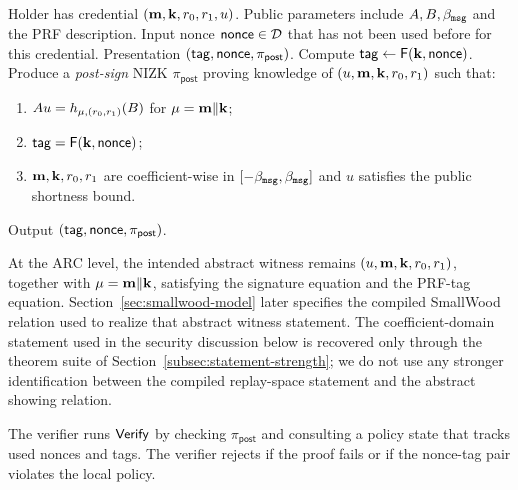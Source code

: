 \begin{algorithm}[H]
\caption{\(\Show\): ARC presentation (canonical protocol)}
\label{alg:showing}
\begin{algorithmic}[1]
\Require Holder has credential \((\mathbf{m},\mathbf{k},r_0,r_1,u)\). Public parameters include \(A,B,\beta_{\mathtt{msg}}\) and the PRF description.
\Require Input nonce \(\mathsf{nonce}\in\mathcal{D}\) that has not been used before for this credential.
\Ensure Presentation \((\mathsf{tag},\mathsf{nonce},\pi_{\mathsf{post}})\).
\State Compute \(\mathsf{tag}\gets \mathsf{F}(\mathbf{k},\mathsf{nonce})\).
\State Produce a \emph{post-sign} NIZK \(\pi_{\mathsf{post}}\) proving knowledge of \((u,\mathbf{m},\mathbf{k},r_0,r_1)\) such that:
\begin{enumerate}[leftmargin=1.6em]
  \item \(A u = h_{\mathbf{\mu},(r_0,r_1)}(B)\) for \(\mathbf{\mu}=\mathbf{m}\Vert \mathbf{k}\);
  \item \(\mathsf{tag} = \mathsf{F}(\mathbf{k},\mathsf{nonce})\);
  \item \(\mathbf{m},\mathbf{k},r_0,r_1\) are coefficient-wise in \([-\beta_{\mathtt{msg}},\beta_{\mathtt{msg}}]\) and \(u\) satisfies the public shortness bound.
\end{enumerate}
\State Output \((\mathsf{tag},\mathsf{nonce},\pi_{\mathsf{post}})\).
\end{algorithmic}
\end{algorithm}

At the ARC level, the intended abstract witness remains 
\((u,\mathbf{m},\mathbf{k},r_0,r_1)\), together with
\(\mathbf{\mu}=\mathbf{m}\Vert \mathbf{k}\), satisfying the signature equation and
 the PRF-tag equation. Section~\ref{sec:smallwood-model} later specifies the compiled SmallWood relation used to realize
that abstract witness statement. The coefficient-domain statement used in the security discussion below is recovered only
through the theorem suite of Section~\ref{subsec:statement-strength}; we do not use any stronger identification between
the compiled replay-space statement and the abstract showing relation.

The verifier runs \(\mathsf{Verify}\) by checking \(\pi_{\mathsf{post}}\) and consulting a policy state that tracks used
nonces and tags. The verifier rejects if the proof fails or if the nonce-tag pair violates the local policy.

